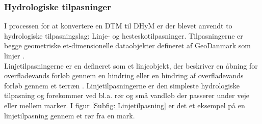 \subsubsection{Hydrologiske tilpasninger} \label{Afsnit: Hydrologiske tilpasninger}
I processen for at konvertere en DTM til DHyM er der blevet anvendt to hydrologiske tilpasningslag: Linje- og hesteskotilpasninger. Tilpasningerne er begge geometriske et-dimensionelle dataobjekter defineret af GeoDanmark som linjer \citep{GeoDanmark_HydroLag}. \\
Linjetilpasningerne er en defineret som et linjeobjekt, der beskriver en åbning for overfladevands forløb gennem en hindring eller en hindring af overfladevands forløb gennem et terræn \citep{DHMLinje}. 
Linjetilpasningerne er den simpleste hydrologiske tilpasning og forekommer ved bl.a. rør og små vandløb der passerer under veje eller mellem marker. I figur \ref{Subfig: Linjetilpasning} er det et eksempel på en linjetilpasning gennem et rør fra en mark.\\

